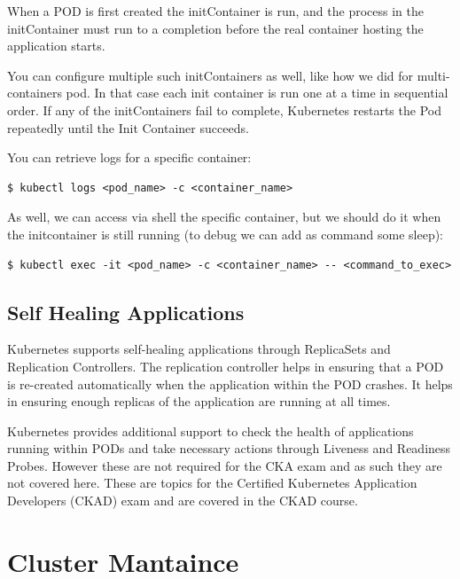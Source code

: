 \documentclass{article}
\newenvironment{blocktemplateII}[1]{%
    \tcolorbox[beamer,%
    noparskip,breakable,
    colframe=Green,%
    colbacklower=LimeGreen!75!LightGreen,%
    title=#1]}%
    {\endtcolorbox}
\newenvironment{codetemplate}[1][]{%
  \mybasecolorbox[#1]
  \itshape
}{%
  \endmybasecolorbox
}
\begin{document}
When a POD is first created the initContainer is run, and the process in the initContainer must run to a completion before the real container hosting the application starts. 

You can configure multiple such initContainers as well, like how we did for multi-containers pod. In that case each init container is run one at a time in sequential order. If any of the initContainers fail to complete, Kubernetes restarts the Pod repeatedly until the Init Container succeeds.

You can retrieve logs for a specific container:
\begin{codetemplate}{}
\begin{verbatim}
$ kubectl logs <pod_name> -c <container_name>
\end{verbatim}
\end{codetemplate}

\begin{blocktemplateII}{NOTE}
As well, we can access via shell the specific container,
but we should do it when the initcontainer is still running (to debug we can add as command some sleep):
\begin{codetemplate}{}
\begin{verbatim}
$ kubectl exec -it <pod_name> -c <container_name> -- <command_to_exec>
\end{verbatim}
\end{codetemplate}
\end{blocktemplateII}

\subsection{Self Healing Applications}

Kubernetes supports self-healing applications through ReplicaSets and Replication Controllers. The replication controller helps in ensuring that a POD is re-created automatically when the application within the POD crashes. It helps in ensuring enough replicas of the application are running at all times.

Kubernetes provides additional support to check the health of applications running within PODs and take necessary actions through Liveness and Readiness Probes. However these are not required for the CKA exam and as such they are not covered here. These are topics for the Certified Kubernetes Application Developers (CKAD) exam and are covered in the CKAD course.

\section{Cluster Mantaince}
\end{document}
